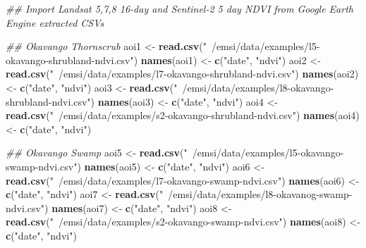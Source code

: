 \documentclass[
]{article}
\newenvironment{Shaded}{\begin{snugshade}}{\end{snugshade}}
\newcommand{\CommentTok}[1]{\textcolor[rgb]{0.56,0.35,0.01}{\textit{#1}}}
\newcommand{\KeywordTok}[1]{\textcolor[rgb]{0.13,0.29,0.53}{\textbf{#1}}}
\newcommand{\NormalTok}[1]{#1}
\newcommand{\StringTok}[1]{\textcolor[rgb]{0.31,0.60,0.02}{#1}}
\begin{document}
\begin{Shaded}
\begin{Highlighting}[]
\CommentTok{## Import Landsat 5,7,8 16-day and Sentinel-2 5 day NDVI from Google Earth Engine extracted CSVs}

\CommentTok{## Okavango Thornscrub}
\NormalTok{aoi1 <-}\StringTok{ }\KeywordTok{read.csv}\NormalTok{(}\StringTok{"~/emsi/data/examples/l5-okavango-shrubland-ndvi.csv"}\NormalTok{)}
\KeywordTok{names}\NormalTok{(aoi1) <-}\StringTok{ }\KeywordTok{c}\NormalTok{(}\StringTok{"date"}\NormalTok{, }\StringTok{"ndvi"}\NormalTok{)}
\NormalTok{aoi2 <-}\StringTok{ }\KeywordTok{read.csv}\NormalTok{(}\StringTok{"~/emsi/data/examples/l7-okavango-shrubland-ndvi.csv"}\NormalTok{)}
\KeywordTok{names}\NormalTok{(aoi2) <-}\StringTok{ }\KeywordTok{c}\NormalTok{(}\StringTok{"date"}\NormalTok{, }\StringTok{"ndvi"}\NormalTok{)}
\NormalTok{aoi3 <-}\StringTok{ }\KeywordTok{read.csv}\NormalTok{(}\StringTok{"~/emsi/data/examples/l8-okavango-shrubland-ndvi.csv"}\NormalTok{)}
\KeywordTok{names}\NormalTok{(aoi3) <-}\StringTok{ }\KeywordTok{c}\NormalTok{(}\StringTok{"date"}\NormalTok{, }\StringTok{"ndvi"}\NormalTok{)}
\NormalTok{aoi4 <-}\StringTok{ }\KeywordTok{read.csv}\NormalTok{(}\StringTok{"~/emsi/data/examples/s2-okavango-shrubland-ndvi.csv"}\NormalTok{)}
\KeywordTok{names}\NormalTok{(aoi4) <-}\StringTok{ }\KeywordTok{c}\NormalTok{(}\StringTok{"date"}\NormalTok{, }\StringTok{"ndvi"}\NormalTok{)}

\CommentTok{## Okavango Swamp}
\NormalTok{aoi5 <-}\StringTok{ }\KeywordTok{read.csv}\NormalTok{(}\StringTok{"~/emsi/data/examples/l5-okavango-swamp-ndvi.csv"}\NormalTok{)}
\KeywordTok{names}\NormalTok{(aoi5) <-}\StringTok{ }\KeywordTok{c}\NormalTok{(}\StringTok{"date"}\NormalTok{, }\StringTok{"ndvi"}\NormalTok{)}
\NormalTok{aoi6 <-}\StringTok{ }\KeywordTok{read.csv}\NormalTok{(}\StringTok{"~/emsi/data/examples/l7-okavango-swamp-ndvi.csv"}\NormalTok{)}
\KeywordTok{names}\NormalTok{(aoi6) <-}\StringTok{ }\KeywordTok{c}\NormalTok{(}\StringTok{"date"}\NormalTok{, }\StringTok{"ndvi"}\NormalTok{)}
\NormalTok{aoi7 <-}\StringTok{ }\KeywordTok{read.csv}\NormalTok{(}\StringTok{"~/emsi/data/examples/l8-okavanog-swamp-ndvi.csv"}\NormalTok{)}
\KeywordTok{names}\NormalTok{(aoi7) <-}\StringTok{ }\KeywordTok{c}\NormalTok{(}\StringTok{"date"}\NormalTok{, }\StringTok{"ndvi"}\NormalTok{)}
\NormalTok{aoi8 <-}\StringTok{ }\KeywordTok{read.csv}\NormalTok{(}\StringTok{"~/emsi/data/examples/s2-okavango-swamp-ndvi.csv"}\NormalTok{)}
\KeywordTok{names}\NormalTok{(aoi8) <-}\StringTok{ }\KeywordTok{c}\NormalTok{(}\StringTok{"date"}\NormalTok{, }\StringTok{"ndvi"}\NormalTok{)}


\end{Highlighting}
\end{Shaded}
\end{document}
